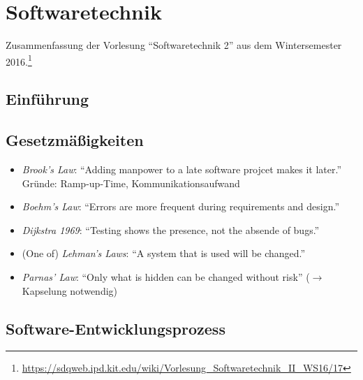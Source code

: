 \chapter{Softwaretechnik}

Zusammenfassung der Vorlesung "`Softwaretechnik 2"' aus dem Wintersemester 2016.\footnote{\url{https://sdqweb.ipd.kit.edu/wiki/Vorlesung_Softwaretechnik_II_WS16/17}}

\section{Einführung}

\section{Gesetzmäßigkeiten}
\begin{itemize}
	\item \textit{Brook's Law}: "`Adding manpower to a late software projcet makes it later."' Gründe: Ramp-up-Time, Kommunikationsaufwand
	\item \textit{Boehm's Law}: "`Errors are more frequent during requirements and design."'
	\item \textit{Dijkstra 1969}: "`Testing shows the presence, not the absende of bugs."'
	\item (One of) \textit{Lehman's Laws}: "`A system that is used will be changed."'
	\item \textit{Parnas' Law}: "`Only what is hidden can be changed without risk"' (\(\rightarrow\) Kapselung notwendig)
\end{itemize}



\section{Software-Entwicklungsprozess}

